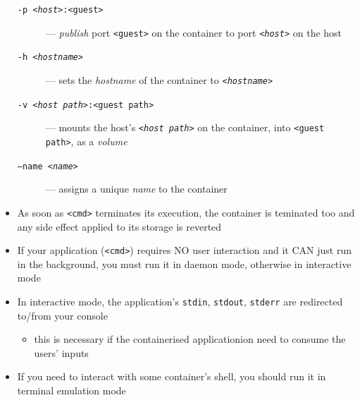 \documentclass[presentation]{beamer}\mode<presentation>{\usetheme{AMSBolognaFC}}
\begin{document}
\begin{frame}[allowframebreaks]
\begin{itemize}
\begin{description}
        \item[\texttt{-p \textit{<host>}:<guest>}] --- \emph{\alert{p}ublish} port \texttt{<guest>} on the container to port \texttt{\textit{<host>}} on the host

        \item[\texttt{-h \textit{<hostname>}}]  ---  sets the \emph{\alert{h}ostname} of the container to \texttt{\textit{<hostname>}}

        \item[\texttt{-v \textit{<host path>}:<guest path>}]  ---  mounts the host's \texttt{\textit{<host path>}} on the container, into \texttt{<guest path>}, as a \emph{\alert{v}olume}

        \item[\texttt{--name \textit{<name>}}]  ---  assigns a unique \emph{\alert{n}ame} to the container
    \end{description}

    \framebreak

    \item As soon as \texttt{<cmd>} terminates its execution, the container is teminated too and any side effect applied to its storage is reverted

    \medskip

    \item If your application (\texttt{<cmd>}) requires NO user interaction and it CAN just run in the background, you must run it in daemon mode, otherwise in interactive mode

    \medskip

    \item In interactive mode, the application's \texttt{stdin}, \texttt{stdout}, \texttt{stderr} are redirected to/from your console
    \begin{itemize}
        \item this is necessary if the containerised applicationion need to consume the users' inputs
    \end{itemize}

    \medskip

    \item If you need to interact with some container's shell, you should run it in terminal emulation mode
\end{itemize}

\end{frame}
\end{document}
